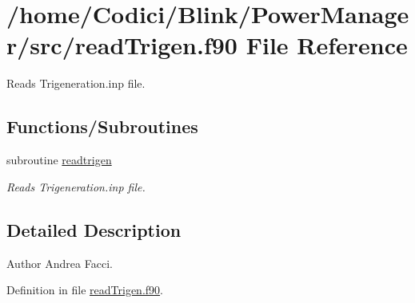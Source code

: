 \hypertarget{read_trigen_8f90}{\section{/home/\-Codici/\-Blink/\-Power\-Manager/src/read\-Trigen.f90 File Reference}
\label{read_trigen_8f90}
}


Reads Trigeneration.\-inp file.  


\subsection*{Functions/\-Subroutines}
\begin{DoxyCompactItemize}
\item 
subroutine \hyperlink{read_trigen_8f90_a2048dd756a11560009d65015dc03f317}{readtrigen}
\begin{DoxyCompactList}\small\item\em Reads Trigeneration.\-inp file. \end{DoxyCompactList}\end{DoxyCompactItemize}


\subsection{Detailed Description}
\begin{DoxyAuthor}{Author}
Andrea Facci. 
\end{DoxyAuthor}


Definition in file \hyperlink{read_trigen_8f90_source}{read\-Trigen.\-f90}.



